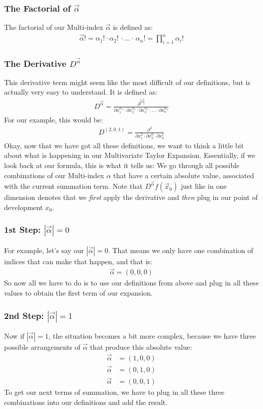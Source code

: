 \subsubsection*{The Factorial of $\vec{\alpha}$}
The factorial of our Multi-index $\vec{\alpha}$ is defined as:
\begin{align}
	\vec{\alpha}! = \alpha_1!\cdot\alpha_2!\,\cdot\dots\cdot\,\alpha_n! = \prod_{i=1}^n \alpha_i!
\end{align}

\subsubsection*{The Derivative $D^{\vec{\alpha}}$}
This derivative term might seem like the most difficult of our definitions, but is actually very easy to understand. It is defined as:
\begin{align}
	D^{\vec{\alpha}}=\frac{\partial^{|\vec{\alpha}|}}{\partial x_1^{\alpha_1}\cdot \partial x_2^{\alpha_2}\cdot\partial x_3^{\alpha_3}\cdot\dots\cdot\partial x_n^{\alpha_n}}
\end{align}
For our example, this would be:
\begin{align}
	D^{(2,0,1)}=\frac{\partial^3}{\partial x_1^2 \cdot \partial x_2^0 \cdot \partial x_3^1}
\end{align}
Okay, now that we have got all these definitions, we want to think a little bit about what is happening in our Multivariate Taylor Expansion.
Essentially, if we look back at our formula, this is what it tells us:
We go through all possible combinations of our Multi-index $\alpha$ that have a certain absolute value, associated with the current summation term. 
Note that $D^{\vec{\alpha}}f(\vec{x}_0)$ just like in one dimension denotes that we \textit{first} apply the derivative and \textit{then} plug in our point of development $x_0$.

\subsubsection*{1st Step: $|\vec{\alpha}|=0$}
For example, let's say our $|\vec{\alpha}|=0$. That means we only have one combination of indices that can make that happen, and that is:
\begin{align}
	\vec{\alpha}=(0,0,0)
\end{align}
So now all we have to do is to use our definitions from above and plug in all these values to obtain the first term of our expansion. 

\subsubsection*{2nd Step: $|\vec{\alpha}|=1$}
Now if $|\vec{\alpha}|=1$, the situation becomes a bit more complex, because we have three possible arrangements of $\vec{\alpha}$ that produce this absolute value:
\begin{align}
	\vec{\alpha} &= (1,0,0) \\
	\vec{\alpha} &= (0,1,0) \\
	\vec{\alpha} &= (0,0,1)
\end{align}
To get our next terms of summation, we have to plug in all these three combinations into our definitions and add the result.

